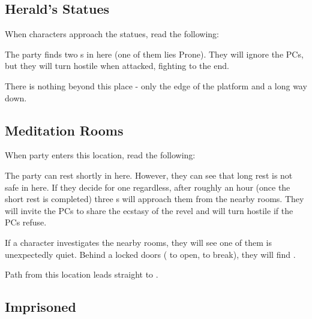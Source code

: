 \subsection{Herald's Statues}
\label{ssec:revelryStatues}

When characters approach the statues, read the following:


The party finds two \enemyRevelerDrinking{}s in here (one of them lies Prone). They will ignore the PCs, but they will turn hostile when attacked, fighting to the end.

There is nothing beyond this place - only the edge of the platform and a long way down.




\subsection{Meditation Rooms}
\label{ssec:revelryPrivate}

When party enters this location, read the following:


The party can rest shortly in here. However, they can see that long rest is not safe in here. If they decide for one regardless, after roughly an hour (once the short rest is completed) three \enemyRevelerSadistic{}s will approach them from the nearby rooms. They will invite the PCs to share the ecstasy of the revel and will turn hostile if the PCs refuse.

If a character investigates the nearby rooms, they will see one of them is unexpectedly quiet. Behind a locked doors ( to open,  to break), they will find .

Path from this location leads straight to .




\subsection{Imprisoned \npcRevelerGeneralName{}}
\label{ssec:revelryPrison}

